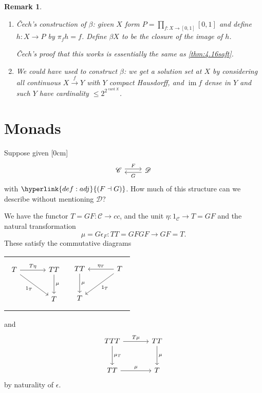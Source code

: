 \documentclass{article}
\let\to\longrightarrow
\newtheorem{nremark}[nthm]{Remark}
\begin{document}
\begin{nremark}\leavevmode
  \begin{enumerate}[label=(\alph*)]
    \item \v{C}ech's construction of $\beta$: given $X$ form $P = \prod_{f: X \to [0,1]} [0,1]$ and define $h: X \to P$ by $\pi_f h = f$.
      Define $\beta X$ to be the closure of the image of $h$.

      \v{C}ech's proof that this works is essentially the same as \cref{thm:4.16saft}.
    \item We could have used  to construct $\beta$: we get a solution set at $X$ by considering all continuous $X \overset{f}\to Y$ with $Y$ compact Hausdorff, and $\operatorname{im} f$ dense in $Y$ and such $Y$ have cardinality $\leq 2^{2^{\operatorname{card} X}}$.
  \end{enumerate}
\end{nremark}
\clearpage
\section{Monads}
Suppose given
[0cm]
\begin{equation*}
  \begin{tikzcd}
    \mathscr{C} \rar[shift left]{F} & \mathscr{D} \lar[shift left]{G}
  \end{tikzcd}
\end{equation*}
with $\hyperlink{def:adj}{(F \dashv G)}$.
How much of this structure can we describe without mentioning $\mathscr{D}$?

We have the functor $T= GF: \mathscr{C} \to cc$, and the unit $\eta: 1_\mathscr{C} \to T = GF$ and the natural transformation
\begin{equation*}
  \mu = G\epsilon_F: TT = GFGF \to GF = T.
\end{equation*}
These satisfy the commutative diagrams

\noindent
\begin{tabularx}{\linewidth}{XX}
\begin{equation}
  \begin{tikzcd}[sep=large, ampersand replacement=\&]
    T \rar{T\eta} \drar[']{1_T} \& TT \dar{\mu}\\
                             \& T
  \end{tikzcd} \label{eq:monad1}
\end{equation}
&
\begin{equation}
  \begin{tikzcd}[sep=large, ampersand replacement=\&]
    TT \dar{\mu} \& T \lar[']{\eta_T} \arrow[dl, "1_T"] \\
    T
  \end{tikzcd} \label{eq:monad2}
\end{equation}
\end{tabularx}
and
\begin{equation}
  \begin{tikzcd}[sep=large]
    TTT \rar{T\mu} \dar{\mu_T} & TT \dar{\mu} \\
    TT \rar{\mu} & T
  \end{tikzcd} \label{eq:monad3}
\end{equation}
by naturality of $\epsilon$.
\end{document}
